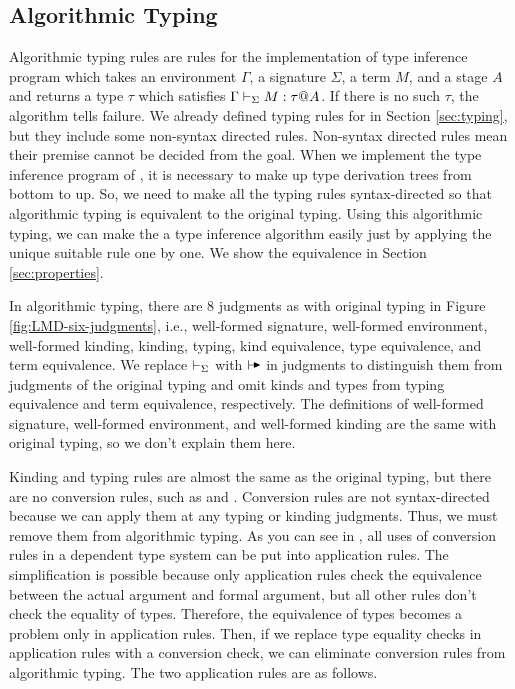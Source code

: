 \subsection{Algorithmic Typing}



Algorithmic typing rules are rules for the implementation of type inference
program which takes an environment \( \Gamma \), a signature \( \Sigma \), a
term \( M \), and a stage \( A \) and returns a type \( \tau \) which satisfies
\( \Gamma \vdash_\Sigma M : \tau @ A \). If there is no such \( \tau \), the algorithm tells
failure.  We already defined typing rules for \LMD in Section \ref{sec:typing},
but they include some non-syntax directed rules. Non-syntax directed rules mean
their premise cannot be decided from the goal. When we implement the type
inference program of \LMD, it is necessary to make up type derivation trees
from bottom to up.  So, we need to make all the typing rules syntax-directed so
that algorithmic typing is equivalent to the original typing. Using this
algorithmic typing, we can make the a type inference algorithm easily just by
applying the unique suitable rule one by one. We show the equivalence in
Section \ref{sec:properties}.


In algorithmic typing, there are 8 judgments as with original typing in Figure
\ref{fig:LMD-six-judgments}, i.e., well-formed signature, well-formed
environment, well-formed kinding, kinding, typing, kind equivalence, type
equivalence, and term equivalence. We replace \( \vdash_\Sigma \) with \( \AV \) in
judgments to distinguish them from judgments of the original typing and omit
kinds and types from typing equivalence and term equivalence, respectively. The
definitions of well-formed signature, well-formed environment, and well-formed
kinding are the same with original typing, so we don't explain them here.


Kinding and typing rules are almost the same as the original typing, but there
are no conversion rules, such as \TConv and \KConv. Conversion rules are not
syntax-directed because we can apply them at any typing or kinding judgments.
Thus, we must remove them from algorithmic typing.  As you can see in
\cite{attapl}, all uses of conversion rules in a dependent type system can be
put into application rules. The simplification is possible because only
application rules check the equivalence between the actual argument and formal
argument, but all other rules don't check the equality of types. Therefore, the
equivalence of types becomes a problem only in application rules. Then, if we
replace type equality checks in application rules with a conversion check, we
can eliminate conversion rules from algorithmic typing. The two application
rules are as follows.

